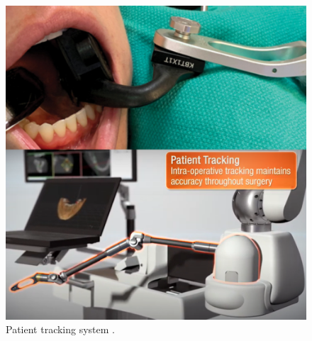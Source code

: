 \begin{figure}[htbp]
\begin{center}
\includegraphics[width=0.8\linewidth]{Images/patient_tracking.png}
\caption[Patient tracking system]{
Patient tracking system \cite{web3}\cite{intraoral_splint}. 
}\label{fig:patient_tracking}
\end{center}
\end{figure}
